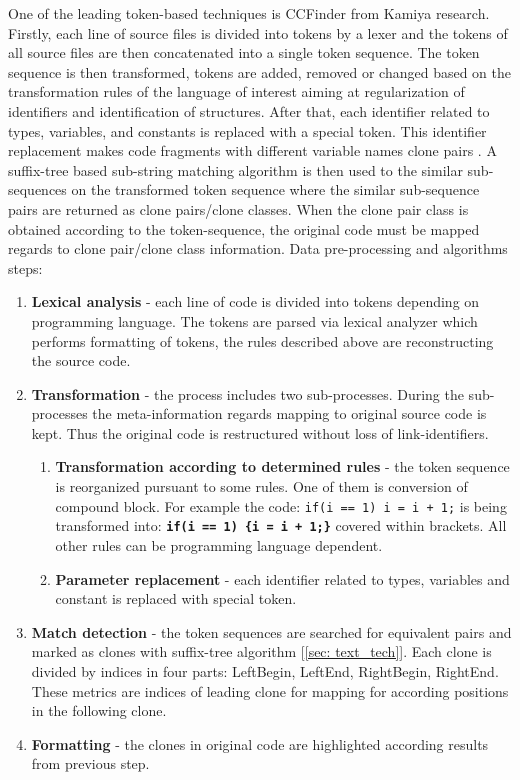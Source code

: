 \documentclass{report}
\begin{document}
One of the leading token-based techniques is CCFinder from Kamiya\cite{tocken_kamiya} research. Firstly, each line of source files is divided into tokens by a lexer and the tokens of all source files are then concatenated into a single token sequence. The token sequence is then transformed, tokens are added, removed or changed based on the transformation rules of the language of interest aiming at regularization of identifiers and identification of structures. 
After that, each identifier related to types, variables, and constants is replaced with a special token\cite{tocken_kamiya}. This identifier replacement makes code fragments with different variable names clone pairs \cite{tocken_kamiya}. A suffix-tree based sub-string matching algorithm is then used 
to the similar sub-sequences on the transformed token sequence where the similar sub-sequence pairs are returned as clone pairs/clone classes\cite{tocken_kamiya}. When the clone pair class is obtained according to the token-sequence, the original code must be mapped regards to clone pair/clone class information. Data pre-processing and algorithms steps:
\begin{enumerate}
  \item \textbf{Lexical analysis} - each line of code is divided into tokens depending on programming language. The tokens are parsed via lexical analyzer which performs formatting of tokens, the rules described above are reconstructing the source code.
\item \textbf{Transformation}  - the process includes two sub-processes. During the sub-processes the meta-information regards mapping to original source code is kept. Thus the original code is restructured without loss of link-identifiers.
  \begin{enumerate}[label*=\arabic*.]
    \item \textbf{Transformation according to determined rules} - the token sequence is reorganized pursuant to some rules. One of them is conversion of compound block. For example the code: \texttt{if(i == 1) i = i + 1;} is being transformed into: \texttt{\textbf{if(i == 1) \{i = i + 1;\}}} covered within brackets. All other rules can be programming language dependent.
    \item \textbf{Parameter replacement} - each identifier related to types, variables and constant is replaced with special token\cite{tocken_kamiya}.
  \end{enumerate} 
  \item\textbf{Match detection} - the token sequences are searched for equivalent pairs and marked as clones with suffix-tree algorithm [\ref{sec: text_tech}]. Each clone is divided by indices in four parts: LeftBegin, LeftEnd, RightBegin, RightEnd. These metrics are indices of leading clone for mapping for according positions in the following clone.
  \item\textbf{Formatting} - the clones in original code are highlighted according results from previous step.
\end{enumerate}
\end{document}
